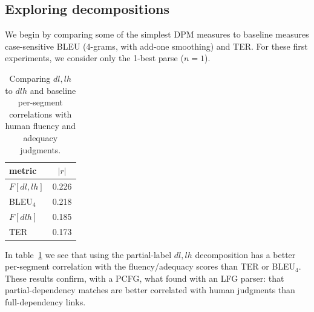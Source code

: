\documentclass{kluwer}    %
\begin{document}
\begin{article}
\subsection{Exploring decompositions}
We begin by comparing some of the simplest DPM measures to baseline
measures case-sensitive BLEU (4-grams, with add-one smoothing) and
TER.  For these first experiments, we consider only the 1-best parse
($n=1$).
\begin{table}
  \caption{Comparing $dl,lh$ to $dlh$ and baseline per-segment correlations with
    human fluency and adequacy judgments.}
  \label{tab:facorr:subgraphs}
  \begin{tabular*}{2.5in}{lr}
    \hline
    metric  &    \multicolumn{1}{c}{$|r|$} \\
    \hline
    $F[dl,lh]$ &   0.226 \\
    BLEU$_4$ &   0.218 \\
    $F[dlh]$ &     0.185 \\
    TER &      0.173 \\
    \hline
  \end{tabular*}
\end{table}
In table~\ref{tab:facorr:subgraphs} we see that using the
partial-label $dl,lh$ decomposition has a better per-segment correlation with the
fluency/adequacy scores than TER or BLEU$_4$.  These results confirm,
with a PCFG, what  found with
an LFG parser: that partial-dependency matches are better correlated
with human judgments than full-dependency links.


\end{article}
\end{document}
